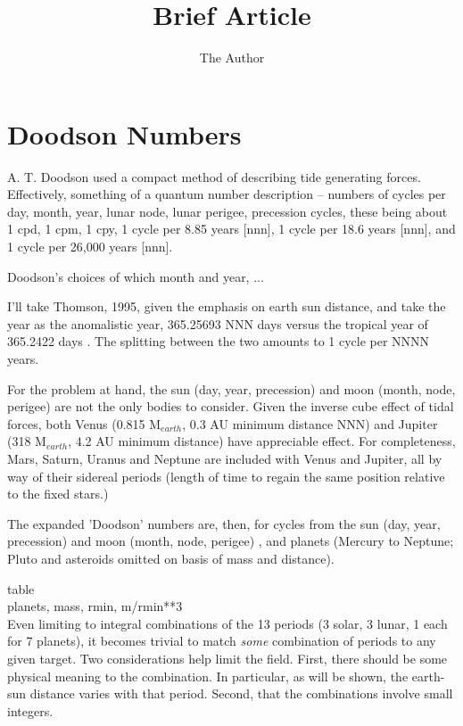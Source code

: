 \documentclass[11pt, oneside]{article}   	%
\title{Brief Article}
\author{The Author}
\begin{document}
\maketitle

\section{Doodson Numbers}
A. T. Doodson \cite{Doodson1928} used a compact method of describing tide generating forces. Effectively, something of a quantum number description -- numbers of cycles per day, month, year, lunar node, lunar perigee, precession cycles, these being about 1 cpd, 1 cpm, 1 cpy, 1 cycle per 8.85 years [nnn], 1 cycle per 18.6 years [nnn], and 1 cycle per 26,000 years [nnn].

Doodson's choices of which month and year, ... 

I'll take Thomson, 1995, given the emphasis on earth sun distance, and take the year as the anomalistic year, 365.25693 NNN days \cite{Thomsonanomalistic} versus the tropical year of 365.2422 days \cite{almanac2001}. The splitting between the two amounts to 1 cycle per NNNN years.

For the problem at hand, the sun (day, year, precession) and moon (month, node, perigee) are not the only bodies to consider. Given the inverse cube effect of tidal forces, both Venus (0.815 M$_{earth}$, 0.3 AU minimum distance NNN) and Jupiter (318 M$_{earth}$, 4.2 AU minimum distance) have appreciable effect. For completeness, Mars, Saturn, Uranus and Neptune are included with Venus and Jupiter, all by way of their sidereal periods (length of time to regain the same position relative to the fixed stars.)

The expanded 'Doodson' numbers are, then, for cycles from the sun (day, year, precession) and moon (month, node, perigee) , and planets (Mercury to Neptune; Pluto and asteroids omitted on basis of mass and distance).

table\\
planets, mass, rmin, m/rmin**3\\

Even limiting to integral combinations of the 13 periods (3 solar, 3 lunar, 1 each for 7 planets), it becomes trivial to match \textit{some} combination of periods to any given target.  Two considerations help limit the field. First, there should be some physical meaning to the combination. In particular, as will be shown, the earth-sun distance varies with that period. Second, that the combinations involve small integers.
\end{document}
